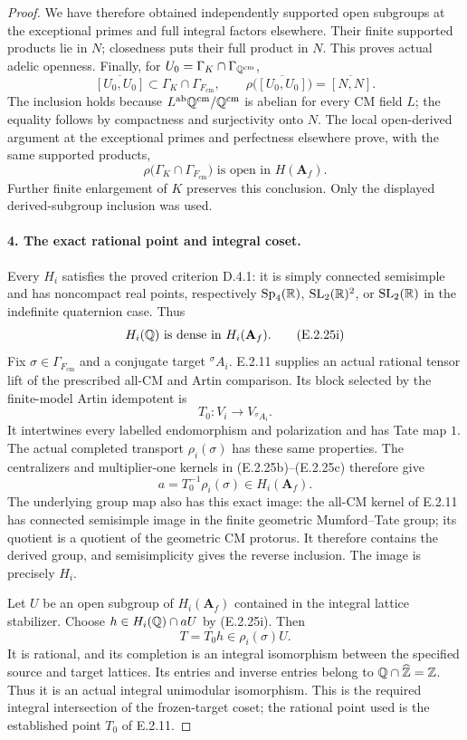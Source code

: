 \begin{proof}
We have therefore obtained independently supported
open subgroups at the exceptional primes and full
integral factors elsewhere. Their finite supported
products lie in \(N\); closedness puts their full
product in \(N\). This proves actual adelic openness.
Finally, for
\(U_0=\Gamma_K\cap\Gamma_{\mathbb Q^{\mathrm{cm}}}\),
\[
 \overline{[U_0,U_0]}
       \subset\Gamma_K\cap\Gamma_{F_{\mathrm{cm}}},
 \qquad
 \rho\bigl(\overline{[U_0,U_0]}\bigr)
       =\overline{[N,N]}.
\]
The inclusion holds because
\(L^{\mathrm{ab}}\mathbb Q^{\mathrm{cm}}/
\mathbb Q^{\mathrm{cm}}\) is abelian for every CM field
\(L\); the equality follows by compactness and
surjectivity onto \(N\). The local open-derived
argument at the exceptional primes and perfectness
elsewhere prove, with the same supported products,
\[
 \rho\bigl(\Gamma_K\cap\Gamma_{F_{\mathrm{cm}}}\bigr)
             \text{ is open in }H(\mathbf A_f).
 \tag{E.2.25h}
\]
Further finite enlargement of \(K\) preserves
this conclusion. Only the displayed derived-subgroup
inclusion was used.

\paragraph{4. The exact rational point and integral coset.}
Every \(H_i\) satisfies the proved criterion D.4.1:
it is simply connected semisimple and has noncompact
real points, respectively \(\operatorname{Sp}_4(\mathbb R)\),
\(\operatorname{SL}_2(\mathbb R)^2\), or
\(\operatorname{SL}_2(\mathbb R)\) in the indefinite
quaternion case. Thus
\[
 H_i(\mathbb Q)\text{ is dense in }H_i(\mathbf A_f).
 \tag{E.2.25i}
\]
Fix \(\sigma\in\Gamma_{F_{\mathrm{cm}}}\) and a
conjugate target \({}^{\sigma}A_i\). E.2.11 supplies
an actual rational tensor lift of the prescribed
all-CM and Artin comparison. Its block selected by
the finite-model Artin idempotent is
\[
 T_0:V_i\longrightarrow V_{{}^{\sigma}A_i}.
\]
It intertwines every labelled endomorphism and
polarization and has Tate map \(1\). The actual
completed transport \(\rho_i(\sigma)\) has these
same properties. The centralizers and multiplier-one
kernels in (E.2.25b)--(E.2.25c) therefore give
\[
 a=T_0^{-1}\rho_i(\sigma)\in H_i(\mathbf A_f).
 \tag{E.2.25j}
\]
The underlying group map also has this exact image:
the all-CM kernel of E.2.11 has connected semisimple
image in the finite geometric Mumford--Tate group;
its quotient is a quotient of the geometric CM
protorus. It therefore contains the derived group,
and semisimplicity gives the reverse inclusion.
The image is precisely \(H_i\).

Let \(U\) be an open subgroup of \(H_i(\mathbf A_f)\)
contained in the integral lattice stabilizer.
Choose \(h\in H_i(\mathbb Q)\cap aU\) by (E.2.25i).
Then
\[
 T=T_0h\in\rho_i(\sigma)U.
 \tag{E.2.25k}
\]
It is rational, and its completion is an integral
isomorphism between the specified source and target
lattices. Its entries and inverse entries belong to
\(\mathbb Q\cap\widehat{\mathbb Z}=\mathbb Z\). Thus it is an actual
integral unimodular isomorphism. This is the required
integral intersection of the frozen-target coset;
the rational point used is the established point
\(T_0\) of E.2.11.


\end{proof}
